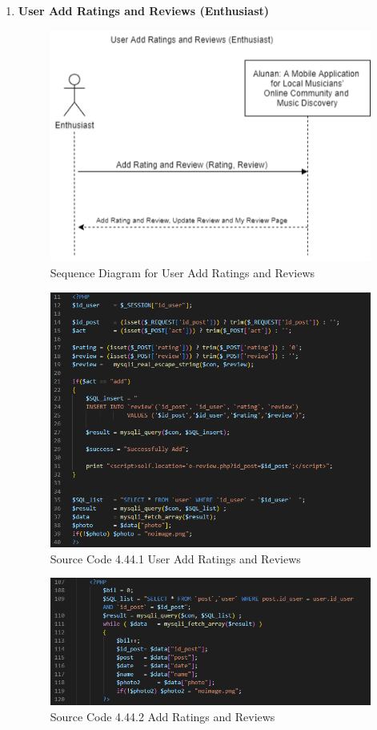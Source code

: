 \begin{enumerate}[1.]
    \item \textbf{User Add Ratings and Reviews (Enthusiast)}
    \begin{figure}[h]
        \centering
        \includegraphics[width=0.8\linewidth]{mainmatter/images/systemint/siaddratings.png}
        \caption{Sequence Diagram for User Add Ratings and Reviews}
        \label{fig:myfig80}
    \end{figure}
    \begin{figure}[h]\ContinuedFloat
        \centering
        \includegraphics[width=0.9\linewidth]{mainmatter/images/systemint/codeaddreview.png}
        \caption*{Source Code 4.44.1 User Add Ratings and Reviews}
        \label{fig:myfig80a}
    \end{figure}
    \clearpage
    \begin{figure}[h]\ContinuedFloat
        \centering
        \includegraphics[width=1.0\linewidth]{mainmatter/images/systemint/codeaddreview2.png}
        \caption*{Source Code 4.44.2 Add Ratings and Reviews}
        \label{fig:myfig80b}
    \end{figure}
    \clearpage


\end{enumerate}
